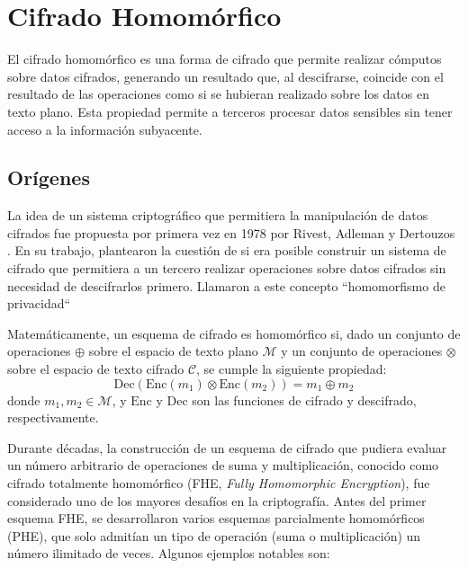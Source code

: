 \chapter{Cifrado Homomórfico}

El cifrado homomórfico es una forma de cifrado que permite realizar cómputos sobre datos cifrados, generando un resultado que, al descifrarse, coincide con el resultado de las operaciones como si se hubieran realizado sobre los datos en texto plano. Esta propiedad permite a terceros procesar datos sensibles sin tener acceso a la información subyacente.

\section{Orígenes}

La idea de un sistema criptográfico que permitiera la manipulación de datos cifrados fue propuesta por primera vez en 1978 por Rivest, Adleman y Dertouzos \cite{RAD78}. En su trabajo, plantearon la cuestión de si era posible construir un sistema de cifrado que permitiera a un tercero realizar operaciones sobre datos cifrados sin necesidad de descifrarlos primero. Llamaron a este concepto ``homomorfismo de privacidad``

Matemáticamente, un esquema de cifrado es homomórfico si, dado un conjunto de operaciones $\oplus$ sobre el espacio de texto plano $\mathcal{M}$ y un conjunto de operaciones $\otimes$ sobre el espacio de texto cifrado $\mathcal{C}$, se cumple la siguiente propiedad:
\begin{equation}
    \text{Dec}(\text{Enc}(m_1) \otimes \text{Enc}(m_2)) = m_1 \oplus m_2
\end{equation}
donde $m_1, m_2 \in \mathcal{M}$, y $\text{Enc}$ y $\text{Dec}$ son las funciones de cifrado y descifrado, respectivamente.

Durante décadas, la construcción de un esquema de cifrado que pudiera evaluar un número arbitrario de operaciones de suma y multiplicación, conocido como cifrado totalmente homomórfico (FHE, \textit{Fully Homomorphic Encryption}), fue considerado uno de los mayores desafíos en la criptografía. Antes del primer esquema FHE, se desarrollaron varios esquemas parcialmente homomórficos (PHE), que solo admitían un tipo de operación (suma o multiplicación) un número ilimitado de veces. Algunos ejemplos notables son:

